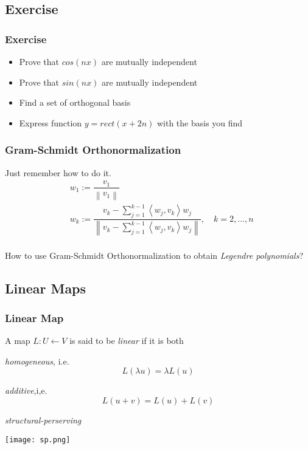 \documentclass[12pt, t]{beamer}
\renewcommand{\emph}[1]{{\color{Turquoise3}\textsl{#1}}}
\newcommand{\nullspace}{~\\[15pt]}
\begin{document}
\subsection{Exercise}

\begin{frame}
    \frametitle{Exercise}
    \begin{itemize}
        \item Prove that $cos(nx)$ are mutually independent
        \item Prove that $sin(nx)$ are mutually independent
        \item Find a set of orthogonal basis
        \item Express function $y=rect(x+2n)$ with the basis you find
    \end{itemize}
\end{frame}

\begin{frame}
    \frametitle{Gram-Schmidt Orthonormalization}
    Just remember how to do it.
    \begin{align*}
         & w_{1}:=\dfrac{v_{1}}{\left\|v_{1}\right\|}                                                                                                                                                 \\
         & w_{k}:=\dfrac{v_{k}-\sum_{j=1}^{k-1}\left\langle w_{j}, v_{k}\right\rangle w_{j}}{\left\|v_{k}-\sum_{j=1}^{k-1}\left\langle w_{j}, v_{k}\right\rangle w_{j}\right\|}, \quad k=2, \ldots, n
    \end{align*}
    \nullspace
    How to use Gram-Schmidt Orthonormalization to obtain \textit{Legendre polynomials}?
\end{frame}

\subsection{Linear Maps}
\begin{frame}
    \frametitle{Linear Map}
    A map $L: U \leftarrow V$ is said to be \emph{linear} if it is both 
    
    \emph{homogeneous}, i.e. 
    \[
    L(\lambda u)=\lambda L(u)    
    \]
    
    \emph{additive},i,e.
    \[
    L(u+v)=L(u)+L(v)    
    \]
    
    \emph{structural-perserving}
    \nullspace
    \begin{center}
    \texttt{[image: sp.png]}
    \end{center}
\end{frame}
\end{document}

